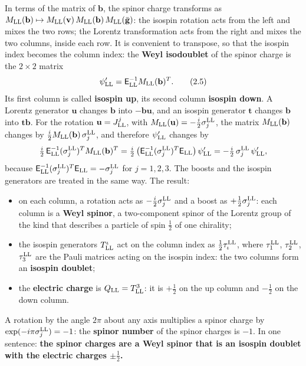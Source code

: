 \documentclass[
  10pt,
]{article}
\providecommand{\tightlist}{%
  \setlength{\itemsep}{0pt}\setlength{\parskip}{0pt}}
\begin{document}
In terms of the matrix of \(\mathbf b\), the spinor charge transforms as
\(M_{\rm LL}(\mathbf b)\mapsto M_{\rm LL}(\mathbf v)\,M_{\rm LL}(\mathbf b)\,M_{\rm LL}(\bar{\mathbf g})\):
the isospin rotation acts from the left and mixes the two rows; the
Lorentz transformation acts from the right and mixes the two columns,
inside each row. It is convenient to transpose, so that the isospin
index becomes the column index: the \textbf{Weyl isodoublet} of the
spinor charge is the \(2\times2\) matrix
\[\psi'_{\rm LL}=\mathsf E_{\rm LL}^{-1}M_{\rm LL}(\mathbf b)^T . \tag{2.5}\]
Its first column is called \textbf{isospin up}, its second column
\textbf{isospin down}. A Lorentz generator \(\mathbf u\) changes
\(\mathbf b\) into \(-\mathbf b\mathbf u\), and an isospin generator
\(\mathbf t\) changes \(\mathbf b\) into \(\mathbf t\mathbf b\). For the
rotation \(\mathbf u=J^j_{\rm LL}\), with
\(M_{\rm LL}(\mathbf u)=-\tfrac i2\sigma^{\rm LL}_j\), the matrix
\(M_{\rm LL}(\mathbf b)\) changes by
\(\tfrac i2M_{\rm LL}(\mathbf b)\,\sigma^{\rm LL}_j\), and therefore
\(\psi'_{\rm LL}\) changes by
\[\tfrac i2\,\mathsf E_{\rm LL}^{-1}(\sigma^{\rm LL}_j)^TM_{\rm LL}(\mathbf b)^T=\tfrac i2\,\big(\mathsf E_{\rm LL}^{-1}(\sigma^{\rm LL}_j)^T\mathsf E_{\rm LL}\big)\,\psi'_{\rm LL}=-\tfrac i2\,\sigma^{\rm LL}_j\,\psi'_{\rm LL},\]
because
\(\mathsf E_{\rm LL}^{-1}(\sigma^{\rm LL}_j)^T\mathsf E_{\rm LL}=-\sigma^{\rm LL}_j\)
for \(j=1,2,3\). The boosts and the isospin generators are treated in
the same way. The result:

\begin{itemize}
\tightlist
\item
  on each column, a rotation acts as \(-\tfrac i2\sigma^{\rm LL}_j\) and
  a boost as \(+\tfrac12\sigma^{\rm LL}_j\): each column is a
  \textbf{Weyl spinor}, a two-component spinor of the Lorentz group of
  the kind that describes a particle of spin \(\tfrac12\) of one
  chirality;
\item
  the isospin generators \(T^\iota_{\rm LL}\) act on the column index as
  \(\tfrac12\tau^{\rm LL}_\iota\), where \(\tau^{\rm LL}_1\),
  \(\tau^{\rm LL}_2\), \(\tau^{\rm LL}_3\) are the Pauli matrices acting
  on the isospin index: the two columns form an \textbf{isospin
  doublet};
\item
  the \textbf{electric charge} is \(Q_{\rm LL}=T^3_{\rm LL}\): it is
  \(+\tfrac12\) on the up column and \(-\tfrac12\) on the down column.
\end{itemize}

A rotation by the angle \(2\pi\) about any axis multiplies a spinor
charge by \(\exp(-i\pi\sigma^{\rm LL}_j)=-1\): the \textbf{spinor
number} of the spinor charges is \(-1\). In one sentence: \textbf{the
spinor charges are a Weyl spinor that is an isospin doublet with the
electric charges \(\pm\tfrac12\).}
\end{document}
